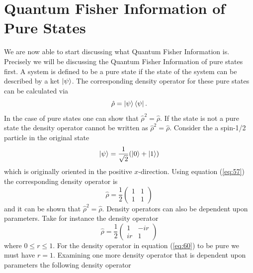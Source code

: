 \documentclass[twocolumn]{article}
\begin{document}
\section*{Quantum Fisher Information of Pure States}
We are now able to start discussing what Quantum Fisher Information is. Precisely we will be discussing the Quantum Fisher Information of pure states first. A system is defined to be a pure state if the state of the system can be described by a ket $\ket{\psi}$. The corresponding density operator for these pure states can be calculated via
\begin{equation} \label{eq:57}
\hat{\rho}=\ket{\psi}\bra{\psi}.
\end{equation}
In the case of pure states one can show that $\hat{\rho}^2=\hat{\rho}$. If the state is not a pure state the density operator cannot be written as $\hat{\rho}^2=\hat{\rho}$. Consider the a spin-1/2 particle in the original state
\begin{equation} \label{eq:58}
\ket{\psi}=\frac{1}{\sqrt{2}}(\ket{0}+\ket{1})
\end{equation}
which is originally oriented in the positive $x$-direction. Using equation (\ref{eq:57}) the corresponding density operator is
\begin{equation} \label{eq:59}
\hat{\rho}=\frac{1}{2}
\begin{pmatrix}
1 & 1 \\
1 & 1
\end{pmatrix}
\end{equation}
and it can be shown that $\hat{\rho}^2=\hat{\rho}$. Density operators can also be dependent upon parameters. Take for instance the density operator
\begin{equation} \label{eq:60}
\hat{\rho}=\frac{1}{2}
\begin{pmatrix}
1 & -ir \\
ir & 1
\end{pmatrix}
\end{equation}
where $0\leq r \leq 1$. For the density operator in equation (\ref{eq:60}) to be pure we must have $r=1$. Examining one more density operator that is dependent upon parameters the following density operator 
\end{document}
